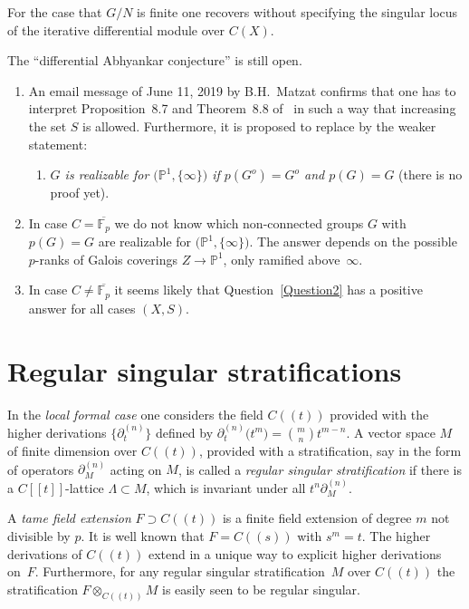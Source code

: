 \documentclass[pdftex]{sigma}
\numberwithin{equation}{section}
\begin{document}
For the case that $G/N$ is finite one recovers \cite[Proposition~8.7]{Ma-vdP2} without specifying the singular locus of the iterative differential module over $C(X)$.

\begin{Remarks} The ``differential Abhyankar conjecture'' is still open.
\begin{enumerate}\itemsep=0pt
\item[(1)] An email message of June 11, 2019 by B.H.~Matzat confirms that one has to interpret Proposition~8.7 and Theorem~8.8 of~\cite{Ma-vdP2} in such a way that increasing the set $S$ is allowed. Furthermore, it is proposed to replace \cite[Theorem~8.11]{Ma-vdP2} by the weaker statement:
 \begin{enumerate}\itemsep=0pt
 \item[]{\it $G$ is realizable for $\big(\mathbb{P}^1,\{\infty \}\big)$ if $p(G^o)=G^o$ and $p(G)=G$} (there is no proof yet).
 \end{enumerate}
\item[(2)] In case $C=\overline{\mathbb{F}_p}$ we do not know which non-connected groups $G$ with $p(G)=G$ are realizable for $\big(\mathbb{P}^1,\{\infty \}\big)$. The answer depends on the possible $p$-ranks of Galois coverings $Z\rightarrow \mathbb{P}^1$, only ramified above~$\infty$.
\item[(3)] In case $C\neq \overline{\mathbb{F}_p}$ it seems likely that Question~\ref{Question2} has a positive answer for all cases $(X,S)$.
\end{enumerate}
\end{Remarks}

\section{Regular singular stratifications}\label{section3}

In the {\it local formal case} one considers the field $C((t))$ provided with the higher derivations $\big\{\partial_t ^{(n)}\big\}$ defined by $\partial _t^{(n)}\big(t^m\big)={m\choose n}t^{m-n}$. A vector space $M$ of finite dimension over $C((t))$, provided with a stratification, say in the form of operators $\partial_M^{(n)}$ acting on $M$, is called a {\it regular singular stratification} if there is a $C[[t]]$-lattice $\Lambda \subset M$, which is invariant under all $t^n\partial_M^{(n)}$.

A {\it tame field extension} $F\supset C((t))$ is a finite field extension of degree $m$ not divisible by $p$. It is well known that $F=C((s))$ with $s^m=t$. The higher derivations of $C((t))$ extend in a unique way to explicit higher derivations on~$F$. Furthermore, for any regular singular stratification~$M$ over $C((t))$ the stratification $F\otimes _{C((t))}M$ is easily seen to be regular singular.
\end{document}
